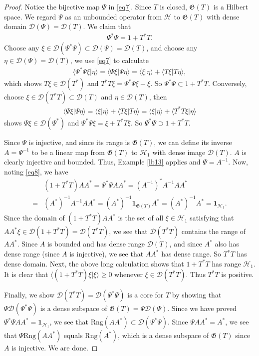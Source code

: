 \documentclass[12pt,b5paper,notitlepage]{article}
\theoremstyle{definition}
\theoremstyle{plain}
\newcommand{\fk}{\mathfrak}
\newcommand{\mc}{\mathcal}
\newcommand{\idt}{\mathbf{1}}
\newcommand{\Dom}{\scr D}
\newcommand{\bk}[1]{\langle {#1}\rangle}
\newcommand{\scr}{\mathscr}
\newcommand{\Rng}{\mathrm{Rng}}
\numberwithin{equation}{section}
\begin{document}
\begin{proof}
Notice the bijective map $\Psi$ in \eqref{eq7}. Since $T$ is closed, $\fk G(T)$ is a Hilbert space. We regard $\Psi$ as an unbounded operator from $\mc H$ to  $\fk G(T)$ with dense domain $\Dom(\Psi)=\Dom(T)$.  We claim that
\begin{align}
\Psi^*\Psi=1+T^*T.	
\end{align}
Choose any $\xi\in\Dom(\Psi^*\Psi)\subset\Dom(\Psi)=\Dom(T)$, and choose any $\eta\in\Dom(\Psi)=\Dom(T)$, we use \eqref{eq7} to calculate
\begin{align*}
\bk{\Psi^*\Psi\xi|\eta}=\bk{\Psi\xi|\Psi\eta}=\bk{\xi|\eta}+\bk{T\xi|T\eta},
\end{align*}
which shows $T\xi\in\Dom(T^*)$ and $T^*T\xi=\Psi^*\Psi\xi-\xi$. So $\Psi^*\Psi\subset 1+T^*T$. Conversely, choose $\xi\in\Dom(T^*T)\subset\Dom(T)$ and $\eta\in\Dom(T)$, then 
\begin{align*}
\bk{\Psi\xi|\Psi\eta}=\bk{\xi|\eta}+\bk{T\xi|T\eta}=\bk{\xi|\eta}+\bk{T^*T\xi|\eta}	
\end{align*}
shows $\Psi\xi\in\Dom(\Psi^*)$ and $\Psi^*\Psi\xi=\xi+T^*T\xi$. So $\Psi^*\Psi\supset 1+T^*T$.

Since $\Psi$ is injective, and since its range is $\fk G(T)$, we can define its inverse $A=\Psi^{-1}$ to be a linear map from $\fk G(T)$ to $\mc H_1$ with dense image $\Dom(T)$. $A$ is clearly injective and bounded. Thus, Example \ref{lb13} applies and $\Psi=A^{-1}$.  Now, noting \eqref{eq8}, we have
\begin{align*}
&(1+T^*T)AA^*=\Psi^*\Psi AA^*=(A^{-1})^*A^{-1}AA^*\\
=&(A^*)^{-1}A^{-1}AA^*=	(A^*)^{-1}\idt_{\fk G(T)} A^*=(A^*)^{-1}A^*=\idt_{\mc H_1}.
\end{align*}
Since the domain of $(1+T^*T)AA^*$ is the set of all $\xi\in\mc H_1$ satisfying that $AA^*\xi\in\Dom(1+T^*T)=\Dom(T^*T)$, we see that $\Dom(T^*T)$ contains the range of $AA^*$. Since $A$ is bounded and has dense range $\Dom(T)$, and since $A^*$ also has dense range (since $A$ is injective), we see that $AA^*$ has dense range. So $T^*T$ has dense domain. Next, the above long calculation shows that $1+T^*T$ has range $\mc H_1$. It is clear that $\bk{(1+T^*T)\xi|\xi}\geq 0$ whenever $\xi\in\Dom(T^*T)$. Thus $T^*T$ is positive.

Finally, we show $\Dom(T^*T)=\Dom(\Psi^*\Psi)$ is a core for $T$ by showing that $\Psi\Dom(\Psi^*\Psi)$ is a dense subspace of $\fk G(T)=\Psi\Dom(\Psi)$. Since we have proved $\Psi^*\Psi AA^*=\idt_{\mc H_1}$, we see that $\Rng(AA^*)\subset\Dom(\Psi^*\Psi)$. Since $\Psi AA^*=A^*$, we see that $\Psi\Rng(AA^*)$ equals $\Rng(A^*)$, which is a dense subspace of $\fk G(T)$ since $A$ is injective. We are done.
\end{proof}
\end{document}

